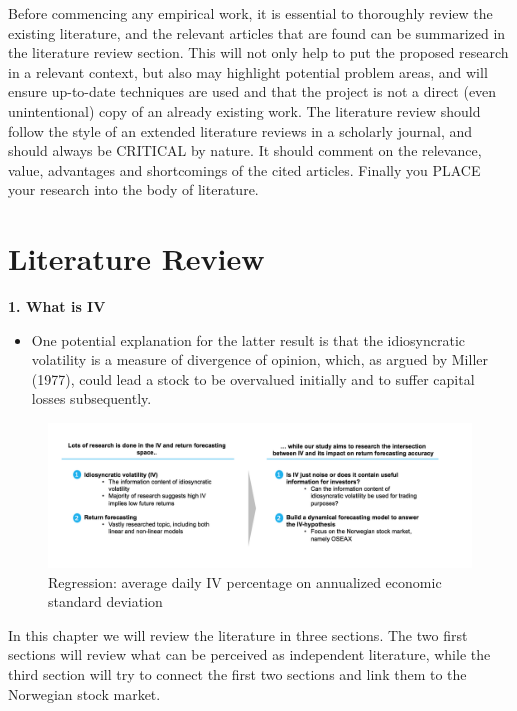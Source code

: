 Before commencing any empirical work, it is essential to thoroughly review the existing literature, and the relevant articles that are found can be summarized in the literature review section. This will not only help to put the proposed research in a relevant context, but also may highlight potential problem areas, and will ensure up-to-date techniques are used and that the project is not a direct (even unintentional) copy of an already existing work. The literature review should follow the style of an extended literature reviews in a scholarly journal, and should always be CRITICAL by nature. It should comment on the relevance, value, advantages and shortcomings of the cited articles. Finally you PLACE your research into the body of literature.


\chapter{Literature Review}

\textbf{1. What is IV}
\begin{itemize}
    \item One potential explanation for the latter result is that the idiosyncratic volatility is a measure of divergence of opinion, which, as argued by Miller (1977), could lead a stock to be overvalued initially and to suffer capital losses subsequently.
\end{itemize}

\begin{figure}[h]
    \centering
    \includegraphics[scale = 0.5]{Plot/DummyLITREW.png}
    \caption{Regression: average daily IV percentage on annualized economic standard deviation}
    \label{IVtoVol}
\end{figure}

In this chapter we will review the literature in three sections. The two first sections will review what can be perceived as independent literature, while the third section will try to connect the first two sections and link them to the Norwegian stock market. 

